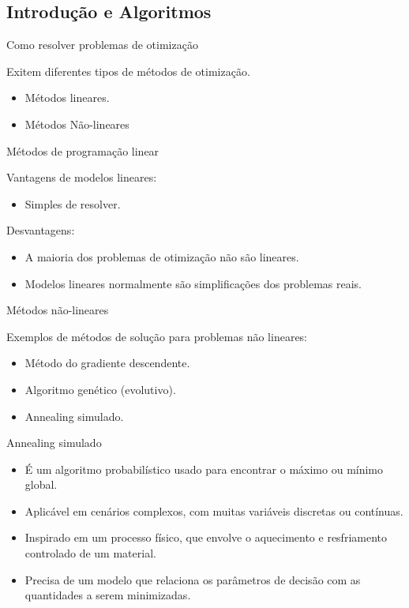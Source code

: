\documentclass{beamer}
\begin{document}
\subsection{Introdução e Algoritmos}


\begin{frame}{Como resolver problemas de otimização}
    
    Exitem diferentes tipos de métodos de otimização.
    
    \begin{itemize}
        \item Métodos lineares.
        \item Métodos Não-lineares
    \end{itemize}
\end{frame}

\begin{frame}{Métodos de programação linear}

\vspace{12pt}
Vantagens de modelos lineares:
\begin{itemize}
    \item Simples de resolver.
\end{itemize}

Desvantagens:
\begin{itemize}
    \item A maioria dos problemas de otimização não são lineares.
    \item Modelos lineares normalmente são simplificações dos problemas reais.
\end{itemize}
\end{frame}


\begin{frame}{Métodos não-lineares}
    
    Exemplos de métodos de solução para problemas não lineares:

    \begin{itemize}
        \item Método do gradiente descendente.
        \item Algoritmo genético (evolutivo).
        \item Annealing simulado.
    \end{itemize}
\end{frame}

\begin{frame}{Annealing simulado}
    \begin{itemize}
    \item É um algoritmo probabilístico usado para encontrar o máximo ou mínimo global.
    \item Aplicável em cenários complexos, com muitas variáveis discretas ou contínuas.
    \item Inspirado em um processo físico, que envolve o aquecimento e resfriamento controlado de um material.
    \item Precisa de um modelo que relaciona os parâmetros de decisão com as quantidades a serem minimizadas.
    \end{itemize}
\end{frame}
\end{document}
